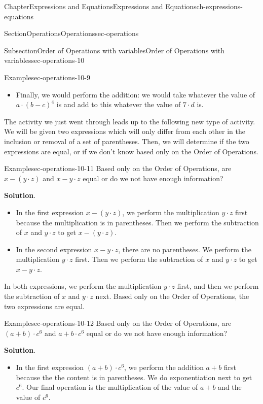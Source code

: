 \documentclass[twoside,11pt,]{book}
\newcommand{\blocktitlefont}{\relax}
\numberwithin{equation}{chapter}
\begin{document}
\begin{chapterptx}{Chapter}{Expressions and Equations}{}{Expressions and Equations}{}{}{ch-expressions-equations}
\begin{sectionptx}{Section}{Operations}{}{Operations}{}{}{sec-operations}
\begin{subsectionptx}{Subsection}{Order of Operations with variables}{}{Order of Operations with variables}{}{}{sec-operations-10}
\begin{example}{Example}{}{sec-operations-10-9}
\begin{itemize}[label=\textbullet]
\item{}Finally, we would perform the addition: we would take whatever the value of \(a \cdot (b-c)^4\) is and add to this whatever the value of \(7 \cdot d\) is.%
\end{itemize}
%
\end{example}
The activity we just went through leads up to the following new type of activity. We will be given two expressions which will only differ from each other in the inclusion or removal of a set of parentheses. Then, we will determine if the two expressions are equal, or if we don't know based only on the Order of Operations.%
\begin{example}{Example}{}{sec-operations-10-11}%
Based only on the Order of Operations, are \(x-(y \cdot z)\) and \(x - y \cdot z\) equal or do we not have enough information?%
\par\smallskip%
\noindent\textbf{\blocktitlefont Solution}.\hypertarget{sec-operations-10-11-2}{}\quad{}%
\begin{itemize}[label=\textbullet]
\item{}In the first expression \(x-(y \cdot z)\), we perform the multiplication \(y \cdot z\) first because the multiplication is in parentheses. Then we perform the subtraction of \(x\) and \(y \cdot z\) to get \(x - (y \cdot z)\).%
\item{}In the second expression \(x - y \cdot z\), there are no parentheses. We perform the multiplication \(y \cdot z\) first. Then we perform the subtraction of \(x\) and \(y \cdot z\) to get \(x - y \cdot z\).%
\end{itemize}
In both expressions, we perform the multiplication \(y \cdot z\) first, and then we perform the subtraction of \(x\) and \(y \cdot z\) next. Based only on the Order of Operations, the two expressions are equal.%
\end{example}
\begin{example}{Example}{}{sec-operations-10-12}%
Based only on the Order of Operations, are \((a+b) \cdot c^6\) and \(a + b \cdot c^6\) equal or do we not have enough information?%
\par\smallskip%
\noindent\textbf{\blocktitlefont Solution}.\hypertarget{sec-operations-10-12-2}{}\quad{}%
\begin{itemize}[label=\textbullet]
\item{}In the first expression \((a+b) \cdot c^6\), we perform the addition \(a+b\) first because the the content is in parentheses. We do exponentiation next to get \(c^6\). Our final operation is the multiplication of the value of \(a+b\) and the value of \(c^6\).%

\end{itemize}
\end{example}
\end{subsectionptx}
\end{sectionptx}
\end{chapterptx}
\end{document}
